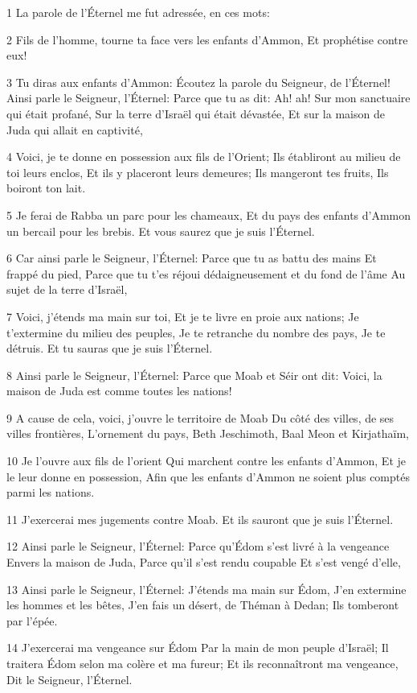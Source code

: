 \par 1 La parole de l'Éternel me fut adressée, en ces mots:
\par 2 Fils de l'homme, tourne ta face vers les enfants d'Ammon, Et prophétise contre eux!
\par 3 Tu diras aux enfants d'Ammon: Écoutez la parole du Seigneur, de l'Éternel! Ainsi parle le Seigneur, l'Éternel: Parce que tu as dit: Ah! ah! Sur mon sanctuaire qui était profané, Sur la terre d'Israël qui était dévastée, Et sur la maison de Juda qui allait en captivité,
\par 4 Voici, je te donne en possession aux fils de l'Orient; Ils établiront au milieu de toi leurs enclos, Et ils y placeront leurs demeures; Ils mangeront tes fruits, Ils boiront ton lait.
\par 5 Je ferai de Rabba un parc pour les chameaux, Et du pays des enfants d'Ammon un bercail pour les brebis. Et vous saurez que je suis l'Éternel.
\par 6 Car ainsi parle le Seigneur, l'Éternel: Parce que tu as battu des mains Et frappé du pied, Parce que tu t'es réjoui dédaigneusement et du fond de l'âme Au sujet de la terre d'Israël,
\par 7 Voici, j'étends ma main sur toi, Et je te livre en proie aux nations; Je t'extermine du milieu des peuples, Je te retranche du nombre des pays, Je te détruis. Et tu sauras que je suis l'Éternel.
\par 8 Ainsi parle le Seigneur, l'Éternel: Parce que Moab et Séir ont dit: Voici, la maison de Juda est comme toutes les nations!
\par 9 A cause de cela, voici, j'ouvre le territoire de Moab Du côté des villes, de ses villes frontières, L'ornement du pays, Beth Jeschimoth, Baal Meon et Kirjathaïm,
\par 10 Je l'ouvre aux fils de l'orient Qui marchent contre les enfants d'Ammon, Et je le leur donne en possession, Afin que les enfants d'Ammon ne soient plus comptés parmi les nations.
\par 11 J'exercerai mes jugements contre Moab. Et ils sauront que je suis l'Éternel.
\par 12 Ainsi parle le Seigneur, l'Éternel: Parce qu'Édom s'est livré à la vengeance Envers la maison de Juda, Parce qu'il s'est rendu coupable Et s'est vengé d'elle,
\par 13 Ainsi parle le Seigneur, l'Éternel: J'étends ma main sur Édom, J'en extermine les hommes et les bêtes, J'en fais un désert, de Théman à Dedan; Ils tomberont par l'épée.
\par 14 J'exercerai ma vengeance sur Édom Par la main de mon peuple d'Israël; Il traitera Édom selon ma colère et ma fureur; Et ils reconnaîtront ma vengeance, Dit le Seigneur, l'Éternel.
